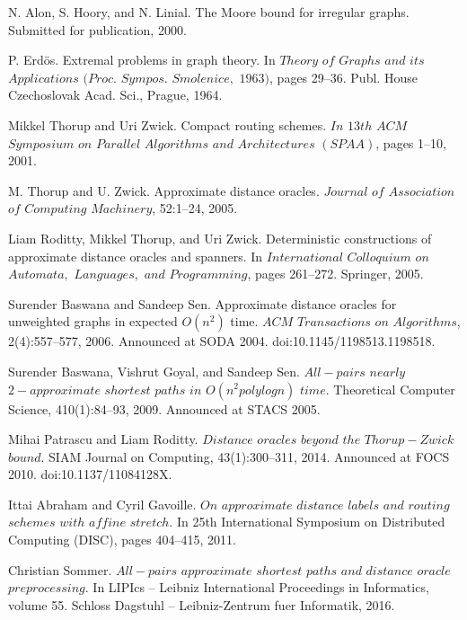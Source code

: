 \documentclass[shortabstract, lic, english]{iithesis}
\theoremstyle{definition} \newtheorem{definition}{Definition}[chapter]
\theoremstyle{plain} \newtheorem{remark}[definition]{Observation}
\theoremstyle{plain} \newtheorem{theorem}[definition]{Theorem}
\theoremstyle{plain} \newtheorem{lemma}[definition]{Lemma}
\theoremstyle{plain} \newtheorem{conjecture}[definition]{Conjecture}
\begin{document}
\begin{thebibliography}{1}
N. Alon, S. Hoory, and N. Linial. The Moore bound for irregular
graphs. Submitted for publication, 2000.

P. Erd{\"o}s. Extremal problems in graph theory. In $Theory$ $of$ $Graphs$
$and$ $its$ $Applications$ $(Proc.$ $Sympos.$ $Smolenice,$ $1963)$, pages 29–36.
Publ. House Czechoslovak Acad. Sci., Prague, 1964.

Mikkel Thorup and Uri Zwick. Compact routing schemes. $In$ $13th$ $ACM$ $Symposium$ $on$
$Parallel$ $Algorithms$ $and$ $Architectures$ $(SPAA)$, pages 1–10, 2001.

M. Thorup and U. Zwick. Approximate distance oracles. $Journal$ $of$ $Association$ $of$ $Computing$
$Machinery$, 52:1–24, 2005.

Liam Roditty, Mikkel Thorup, and Uri Zwick. Deterministic constructions of approximate
distance oracles and spanners. In $International$ $Colloquium$ $on$ $Automata,$ $Languages,$ $and$
$Programming$, pages 261–272. Springer, 2005.

Surender Baswana and Sandeep Sen. Approximate distance oracles for unweighted graphs
in expected $O(n^2)$ time. $ACM$ $Transactions$ $on$ $Algorithms$, 2(4):557–577, 2006. Announced
at SODA 2004. doi:10.1145/1198513.1198518.


Surender Baswana, Vishrut Goyal, and Sandeep Sen. $All-pairs$ $nearly$ $2-approximate$ $shortest$ 
$paths$ $in$ $O(n^2poly log n)$ $time.$ Theoretical Computer Science, 410(1):84–93, 2009. Announced at STACS 2005.

Mihai Patrascu and Liam Roditty. $Distance$ $oracles$ $beyond$ $the$ $Thorup-Zwick$ $bound.$
SIAM Journal on Computing, 43(1):300–311, 2014. Announced at FOCS 2010.
doi:10.1137/11084128X.

Ittai Abraham and Cyril Gavoille. $On$ $approximate$ $distance$ $labels$ $and$ $routing$ $schemes$
$with$ $affine$ $stretch.$ In 25th International Symposium on Distributed Computing (DISC),
pages 404–415, 2011.

Christian Sommer. $All-pairs$ $approximate$ $shortest$ $paths$ $and$ $distance$ $oracle$ $preprocessing.$
In LIPIcs – Leibniz International Proceedings in Informatics, volume 55. Schloss Dagstuhl
– Leibniz-Zentrum fuer Informatik, 2016.


\end{thebibliography}
\end{document}
